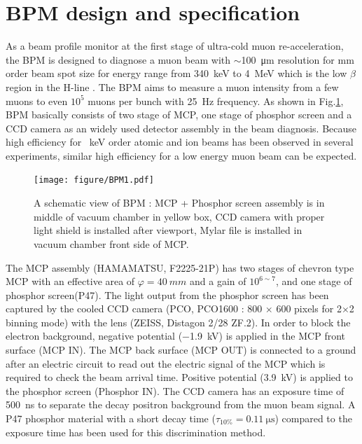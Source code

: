 \documentclass[preprint,3p,twocolumn]{elsarticle}
\begin{document}
\section{BPM design and specification}

As a beam profile monitor at the first stage of ultra-cold muon re-acceleration, the BPM is designed to diagnose a muon beam with $\sim$\SI{100}{\micro\metre} resolution for mm order beam spot size for energy range from \SI{340}{\keV} to \SI{4}{\MeV} which is the low $\beta$ region in the H-line \cite{E34}.
The BPM aims to measure a muon intensity from a few muons to even $10^{5}$ muons per bunch with \SI{25}{\hertz} frequency.
As shown in Fig.\ref{fig:BPM_scheme}, BPM basically consists of two stage of MCP, one stage of phosphor screen and a CCD camera as an widely used detector assembly in the beam diagnosis. %
Because high efficiency for \SI{}{keV} order atomic and ion beams has been observed in several experiments\cite{MCP_efficiency, MCP_efficiency1}, similar high efficiency for a low energy muon beam can be expected. 

\begin{figure}[htb]
\begin{minipage}[t]{65mm}
\texttt{[image: figure/BPM1.pdf]}
\end{minipage}
\vspace{-0.6cm}
\caption{A schematic view of BPM : MCP + Phosphor screen assembly is in middle of vacuum chamber in yellow box, CCD camera with proper light shield is installed after viewport, Mylar file is installed in vacuum chamber front side of MCP. }
\label{fig:BPM_scheme}
\end{figure}

The MCP assembly (HAMAMATSU, F2225-21P) has two stages of chevron type MCP with an effective area of $\varphi=\SI{40}{mm}$ and a gain of $10^{6\sim7}$, and one stage of phosphor screen(P47). The light output from the phosphor screen has been captured by the cooled CCD camera (PCO, PCO1600 : 800 $\times$ 600 pixels for 2$\times$2 binning mode) with the lens (ZEISS, Distagon 2/28 ZF.2). 
In order to block the electron background, negative potential (\SI{-1.9}{\kilo\volt}) is applied in the MCP front surface (MCP IN).
The MCP back surface (MCP OUT) is connected to a ground after an electric circuit to read out the electric signal of the MCP which is required to check the beam arrival time.
Positive potential (\SI{3.9}{\kilo\volt}) is applied to the phosphor screen (Phosphor IN).
The CCD camera has an exposure time of \SI{500}{\nano\s} to separate the decay positron background from the muon beam signal.
A P47 phosphor material with a short decay time ($\tau_{10\%}=\SI{0.11}{\micro\s}$) compared to the exposure time has been used for this discrimination method.
\end{document}
